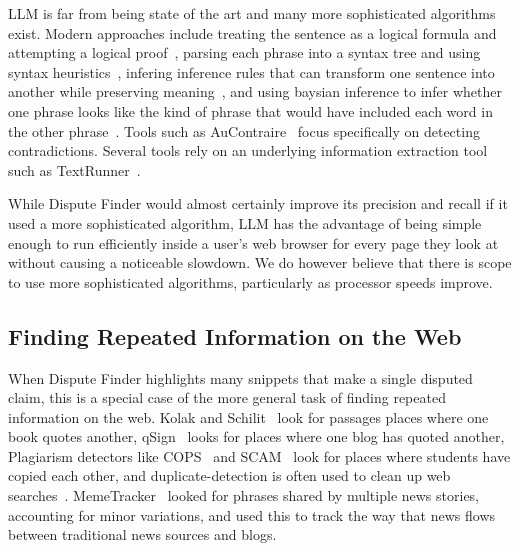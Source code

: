 \documentclass{www2010-submission}
\newcommand{\todo}[1]{}
\begin{document}
\todo{Implement word weighting and word similarity?}

%

LLM is far from being state of the art and many more sophisticated algorithms exist. Modern approaches include treating the sentence as a logical formula and attempting a logical proof~\cite{Bayer2001,Bos2005}, parsing each phrase into a syntax tree and using syntax heuristics~\cite{Snow2006}, infering inference rules that can transform one sentence into another while preserving meaning~\cite{Lin2002,Dinu2009,Bhagat2009}, and using baysian inference to infer whether one phrase looks like the kind of phrase that would have included each word in the other phrase~\cite{Glickman2005}. Tools such as AuContraire~\cite{Ritter2008} focus specifically on detecting contradictions. Several tools rely on an underlying information extraction tool such as TextRunner~\cite{Etzioni2008}.

While Dispute Finder would almost certainly improve its precision and recall if it used a more sophisticated algorithm, LLM has the advantage of being simple enough to run efficiently inside a user's web browser for every page they look at without causing a noticeable slowdown. We do however believe that there is scope to use more sophisticated algorithms, particularly as processor speeds improve.

\todo{Talk about Glickman et all 2005 and MT system of Bayer et al 2005}
\todo{Cite Web Based probabalistic textual entailment}
\todo{Cite MITRE's submission to the EU PASCAL RTE Challenge}

\todo{Talk a lot about how people do textual entailment now}
\todo{Do human-guided approach that works well? Talk more about human guided task.}


\subsection{Finding Repeated Information on the Web}

\todo{is this important}

When Dispute Finder highlights many snippets that make a single disputed claim, this is a special case of the more general task of finding repeated information on the web. Kolak and Schilit~\cite{Kolak2008} look for passages places where one book quotes another, qSign~\cite{Kim2009} looks for places where one blog has quoted another, Plagiarism detectors like COPS~\cite{COPS} and SCAM~\cite{SCAM} look for places where students have copied each other, and duplicate-detection is often used to clean up web searches~\cite{web-copy-detect}. MemeTracker~\cite{Backstrom2009} looked for phrases shared by multiple news stories, accounting for minor variations, and used this to track the way that news flows between traditional news sources and blogs.
\end{document}
